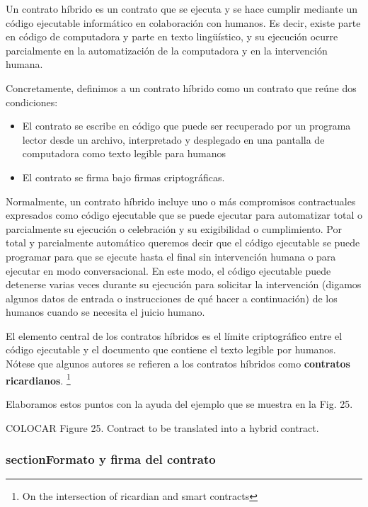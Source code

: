 \documentclass[12pt]{report} %
\begin{document}
\begin{itemize}
Un contrato híbrido es un contrato que se ejecuta y se hace cumplir mediante un código ejecutable informático en colaboración con humanos. Es decir, existe parte en  código de computadora y parte en texto lingüístico, y su ejecución ocurre parcialmente en la automatización de la computadora y en la intervención humana.

Concretamente, definimos a un contrato híbrido como un contrato que reúne dos condiciones:

\begin{itemize}
    \item El contrato se escribe en código que puede ser recuperado por un programa lector desde un archivo, interpretado y desplegado en una pantalla de computadora como texto legible para humanos
    \item El contrato se firma bajo firmas criptográficas.
        
\end{itemize}

Normalmente, un contrato híbrido incluye uno o más compromisos contractuales expresados como código ejecutable que se puede ejecutar para automatizar total o parcialmente su ejecución o celebración  y su exigibilidad o cumplimiento. Por total y parcialmente automático queremos decir que el código ejecutable se puede programar para que se ejecute hasta el final sin intervención humana o para ejecutar en modo conversacional. En este modo, el código ejecutable puede detenerse varias veces durante su ejecución para solicitar la intervención (digamos algunos datos de entrada o instrucciones de qué hacer a continuación) de los humanos cuando se necesita el juicio humano.

El elemento central de los contratos híbridos es el límite criptográfico entre el código ejecutable y el documento que contiene el texto legible por humanos. Nótese que algunos autores se refieren a los contratos híbridos como \textbf{contratos ricardianos}. \footnote{\cite{IanGrigg2015} On the intersection of ricardian and smart contracts}

Elaboramos estos puntos con la ayuda del ejemplo que se muestra en la Fig. 25.

COLOCAR Figure 25. Contract to be translated into a hybrid contract.

\subsubsection{sectionFormato y firma del contrato}


\end{itemize}
\end{document}
